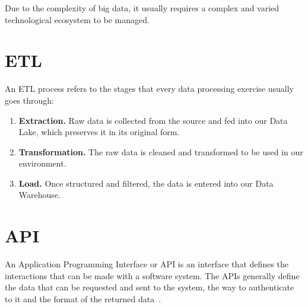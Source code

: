 \nonzeroparskip Due to the complexity of big data, it usually requires a complex and varied technological ecosystem to be managed.

\section{ETL}
\nonzeroparskip An ETL process refers to the stages that every data processing exercise usually goes through:
\begin{enumerate}
	\item \textbf{Extraction.} Raw data is collected from the source and fed into our Data Lake, which preserves it in its original form.
	\item \textbf{Transformation.} The raw data is cleaned and transformed to be used in our environment.
	\item \textbf{Load.} Once structured and filtered, the data is entered into our Data Warehouse.
\end{enumerate}

\section{API}

\nonzeroparskip An Application Programming Interface or API is an interface that defines the interactions that can be made with a software system. The APIs generally define the data that can be requested and sent to the system, the way to authenticate to it and the format of the returned data~\cite{ibm_restapi}.

